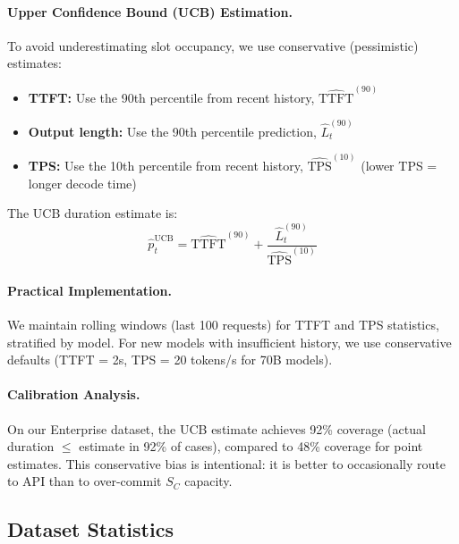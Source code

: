 \paragraph{Upper Confidence Bound (UCB) Estimation.} To avoid underestimating slot occupancy, we use conservative (pessimistic) estimates:
\begin{itemize}
    \item \textbf{TTFT:} Use the 90th percentile from recent history, $\widehat{\text{TTFT}}^{(90)}$
    \item \textbf{Output length:} Use the 90th percentile prediction, $\hat{L}_t^{(90)}$
    \item \textbf{TPS:} Use the 10th percentile from recent history, $\widehat{\text{TPS}}^{(10)}$ (lower TPS = longer decode time)
\end{itemize}

The UCB duration estimate is:
\begin{equation}
    \hat{p}_t^{\text{UCB}} = \widehat{\text{TTFT}}^{(90)} + \frac{\hat{L}_t^{(90)}}{\widehat{\text{TPS}}^{(10)}}
\end{equation}

\paragraph{Practical Implementation.} We maintain rolling windows (last 100 requests) for TTFT and TPS statistics, stratified by model. For new models with insufficient history, we use conservative defaults (TTFT = 2s, TPS = 20 tokens/s for 70B models).

\paragraph{Calibration Analysis.} On our Enterprise dataset, the UCB estimate achieves 92\% coverage (actual duration $\leq$ estimate in 92\% of cases), compared to 48\% coverage for point estimates. This conservative bias is intentional: it is better to occasionally route to API than to over-commit $S_C$ capacity.

\subsection{Dataset Statistics}
\label{app:datasets}

